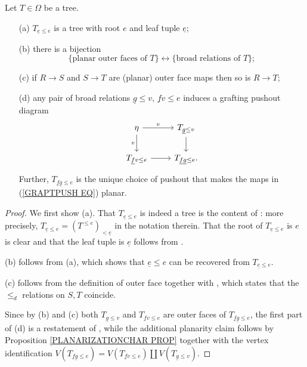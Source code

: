 \documentclass[a4paper,10pt]{article}%
\begin{document}
\begin{proposition}
Let $T \in \Omega$ be a tree.
\begin{itemize}
\item[(a)] $T_{\underline{e} \leq e}$ is a tree with root $e$
and leaf tuple $\underline{e}$;
\item[(b)] there is a bijection
\[
	\{\text{planar outer faces of $T$} \} 
\leftrightarrow 
	\{\text{broad relations of $T$}\};
\]
\item[(c)] if $R \to S$ and $S \to T$ are (planar) outer face maps then so is $R \to T$;
\item[(d)] any pair of broad relations $\underline{g} \leq v$, $\underline{f}v \leq e$ induces a grafting pushout diagram
\begin{equation}\label{GRAPTPUSH EQ}
\begin{tikzcd}
	\eta \ar{r}{v} \ar{d}[swap]{v} & T_{\underline{g} \leq v} \ar{d}
\\
	T_{\underline{f}v \leq e} \ar{r} & T_{\underline{f}\underline{g} \leq e}.
\end{tikzcd}
\end{equation}
Further, $T_{\underline{f} \underline{g} \leq e}$ is the
unique choice of pushout that makes the maps in (\ref{GRAPTPUSH EQ}) planar.
\end{itemize}
\end{proposition}


\begin{proof}
We first show (a). That $T_{\underline{e} \leq e}$ is indeed a tree is the content of \cite[Prop. 5.20]{Pe17}: more precisely, 
$T_{\underline{e} \leq e} = (T^{\leq e})_{\less \underline{e}}$
in the notation therein. That the root of $T_{\underline{e} \leq e}$ is $e$ is clear and that the leaf tuple is $\underline{e}$ follows from \cite[Remark 5.23]{Pe17}.

 (b) follows from (a), which shows that $\underline{e} \leq e$ can be recovered from
$T_{\underline{e} \leq e}$.

 (c) follows from the definition of outer face together with \cite[Lemma 5.33]{Pe17}, which states that the $\leq_d$ relations on $S,T$ coincide.
 
  Since by (b) and (c) both $T_{\underline{g} \leq v}$ and $T_{\underline{f}v \leq e}$ are outer faces of $T_{\underline{f} \underline{g} \leq e}$, 
the first part of (d) is a restatement of \cite[Prop. 5.15]{Pe17}, while the additional planarity claim 
follows by Proposition \ref{PLANARIZATIONCHAR PROP}
together with the vertex identification
$V(T_{\underline{f} \underline{g} \leq e})=
V(T_{\underline{f} v \leq e}) \amalg V(T_{\underline{g} \leq v})$.
\end{proof}
\end{document}
